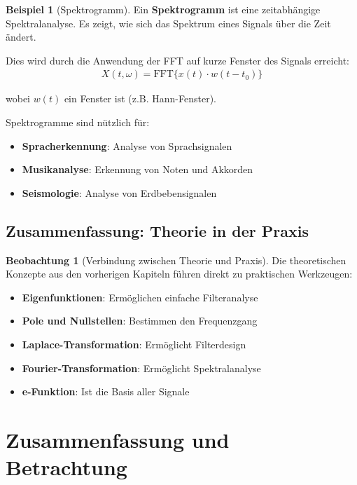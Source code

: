 ﻿\documentclass[a4paper,12pt]{report}
\theoremstyle{definition}
\newtheorem{beispiel}{Beispiel}
\newtheorem{beobachtung}{Beobachtung}
\begin{document}
	\begin{beispiel}[Spektrogramm]
		Ein \textbf{Spektrogramm} ist eine zeitabhängige Spektralanalyse. Es zeigt, wie sich das Spektrum eines Signals über die Zeit ändert.
		
		Dies wird durch die Anwendung der FFT auf kurze Fenster des Signals erreicht:
		\begin{align}
			X(t, \omega) = \text{FFT}\{x(t) \cdot w(t - t_0)\}
		\end{align}
		
		wobei $w(t)$ ein Fenster ist (z.B. Hann-Fenster).
		
		Spektrogramme sind nützlich für:
		\begin{itemize}
			\item[-] \textbf{Spracherkennung}: Analyse von Sprachsignalen
			\item[-] \textbf{Musikanalyse}: Erkennung von Noten und Akkorden
			\item[-] \textbf{Seismologie}: Analyse von Erdbebensignalen
		\end{itemize}
	\end{beispiel}
	
	\section{Zusammenfassung: Theorie in der Praxis}
	
	\begin{beobachtung}[Verbindung zwischen Theorie und Praxis]
		Die theoretischen Konzepte aus den vorherigen Kapiteln führen direkt zu praktischen Werkzeugen:
		\begin{itemize}
			\item[-] \textbf{Eigenfunktionen}: Ermöglichen einfache Filteranalyse
			\item[-] \textbf{Pole und Nullstellen}: Bestimmen den Frequenzgang
			\item[-] \textbf{Laplace-Transformation}: Ermöglicht Filterdesign
			\item[-] \textbf{Fourier-Transformation}: Ermöglicht Spektralanalyse
			\item[-] \textbf{e-Funktion}: Ist die Basis aller Signale
		\end{itemize}
	\end{beobachtung}
	
	\chapter{Zusammenfassung und Betrachtung}
	
\end{document}
